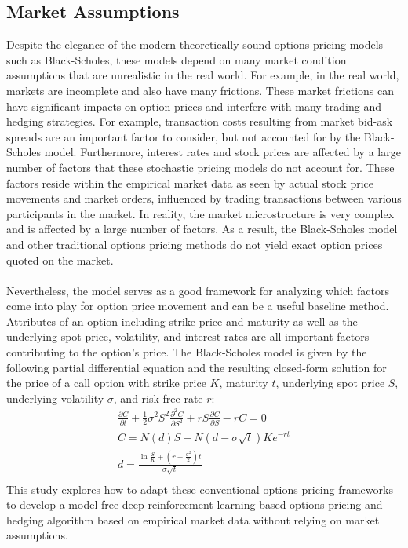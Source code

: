 \subsection{Market Assumptions}

Despite the elegance of the modern theoretically-sound options pricing models such as Black-Scholes, these models depend on many market condition assumptions that are unrealistic in the real world. For example, in the real world, markets are incomplete and also have many frictions. These market frictions can have significant impacts on option prices and interfere with many trading and hedging strategies. For example, transaction costs resulting from market bid-ask spreads are an important factor to consider, but not accounted for by the Black-Scholes model. Furthermore, interest rates and stock prices are affected by a large number of factors that these stochastic pricing models do not account for. These factors reside within the empirical market data as seen by actual stock price movements and market orders, influenced by trading transactions between various participants in the market. In reality, the market microstructure is very complex and is affected by a large number of factors. As a result, the Black-Scholes model and other traditional options pricing methods do not yield exact option prices quoted on the market. 
\\
\\
Nevertheless, the model serves as a good framework for analyzing which factors come into play for option price movement and can be a useful baseline method. Attributes of an option including strike price and maturity as well as the underlying spot price, volatility, and interest rates are all important factors contributing to the option's price. The Black-Scholes model is given by the following partial differential equation and the resulting closed-form solution for the price of a call option with strike price $K$, maturity $t$, underlying spot price $S$, underlying volatility $\sigma$, and risk-free rate $r$:
\begin{equation}
\begin{aligned}
    \frac{\partial C}{\partial t}+\frac{1}{2}\sigma^2S^2\frac{\partial^2C}{\partial S^2}+rS\frac{\partial C}{\partial S}-rC = 0\\
    C=N(d)S-N(d-\sigma\sqrt{t})Ke^{-rt}\\
    d=\frac{\ln{\frac{S}{K}}+(r+\frac{\sigma^2}{2})t}{\sigma\sqrt{t}}\\
\end{aligned}
\end{equation}
This study explores how to adapt these conventional options pricing frameworks to develop a model-free deep reinforcement learning-based options pricing and hedging algorithm based on empirical market data without relying on market assumptions.

